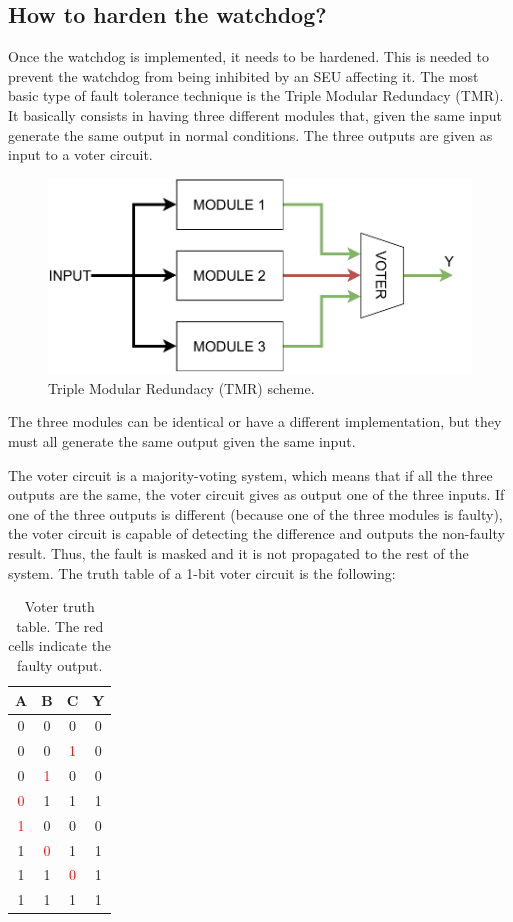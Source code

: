 \subsection{How to harden the watchdog?}

Once the watchdog is implemented, it needs to be hardened. This is needed to prevent the watchdog from being inhibited by an SEU affecting it. The most basic type of fault tolerance technique is the Triple Modular Redundacy (TMR). It basically consists in having three different modules that, given the same input generate the same output in normal conditions. The three outputs are given as input to a voter circuit.

\begin{figure}[H]
\centering
\includegraphics[width=0.9\linewidth]{images/chapter4/tmr.pdf}
\caption{Triple Modular Redundacy (TMR) scheme.}
\label{fig:tmr_scheme}
\end{figure}

The three modules can be identical or have a different implementation, but they must all generate the same output given the same input. \bigskip

The voter circuit is a majority-voting system, which means that if all the three outputs are the same, the voter circuit gives as output one of the three inputs. If one of the three outputs is different (because one of the three modules is faulty), the voter circuit is capable of detecting the difference and outputs the non-faulty result. Thus, the fault is masked and it is not propagated to the rest of the system. The truth table of a 1-bit voter circuit is the following:

\begin{table}[H]
\centering
\begin{tabular}{ ccc|c }
    \textbf{A}&\textbf{B}&\textbf{C}&\textbf{Y}\\
    \hline
    0&0&0&0\\
    0&0&\textcolor{red}1&0\\
    0&\textcolor{red}1&0&0\\
    \textcolor{red}0&1&1&1\\
    \textcolor{red}1&0&0&0\\
    1&\textcolor{red}0&1&1\\
    1&1&\textcolor{red}0&1\\
    1&1&1&1\\
\end{tabular}
\caption{Voter truth table. The red cells indicate the faulty output.}
\end{table}

